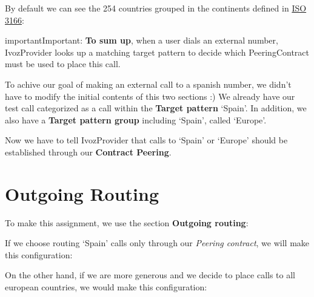 \documentclass[letterpaper,10pt,english]{sphinxmanual}
\begin{document}
By default we can see the 254 countries grouped in the continents defined in
\href{https://es.wikipedia.org/wiki/ISO\_3166}{ISO 3166}:


\begin{notice}{important}{Important:}
\textbf{To sum up}, when a user dials an external number, IvozProvider
looks up a matching target pattern to decide which PeeringContract must be used
to place this call.
\end{notice}

To achive our goal of making an external call to a spanish number, we didn't have
to modify the initial contents of this two sections :)
\label{external_outgoing_calls/call_routing:outgoing-routes}
We already have our test call categorized as a call within the \textbf{Target pattern}
`Spain'. In addition, we also have a \textbf{Target pattern group} including `Spain',
called `Europe'.

Now we have to tell IvozProvider that calls to `Spain' or `Europe' should be
established through our \textbf{Contract Peering}.


\section{Outgoing Routing}
\label{external_outgoing_calls/call_routing::doc}\label{external_outgoing_calls/call_routing:outgoing-routing}
To make this assignment, we use the section \textbf{Outgoing routing}:


If we choose routing `Spain' calls only through our \emph{Peering contract}, we will
make this configuration:


On the other hand, if we are more generous and we decide to place calls to all
european countries, we would make this configuration:
\end{document}
